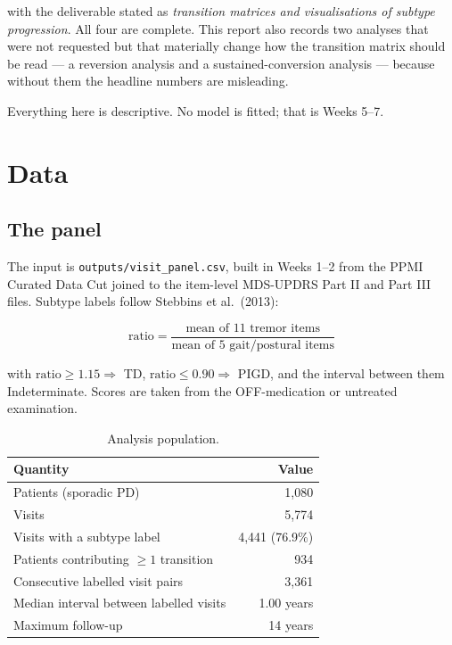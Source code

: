 \documentclass[11pt,a4paper]{article}
\newcommand{\code}[1]{\texttt{\small #1}}
\begin{document}
\noindent
with the deliverable stated as \emph{transition matrices and visualisations of
subtype progression}. All four are complete. This report also records two
analyses that were not requested but that materially change how the transition
matrix should be read --- a reversion analysis and a sustained-conversion
analysis --- because without them the headline numbers are misleading.

Everything here is descriptive. No model is fitted; that is Weeks 5--7.

\section{Data}

\subsection{The panel}

The input is \code{outputs/visit\_panel.csv}, built in Weeks 1--2 from the PPMI
Curated Data Cut joined to the item-level MDS-UPDRS Part II and Part III files.
Subtype labels follow Stebbins et al.\ (2013):

\[
  \text{ratio} = \frac{\text{mean of 11 tremor items}}{\text{mean of 5 gait/postural items}}
\]

with $\text{ratio} \geq 1.15 \Rightarrow$ TD, $\text{ratio} \leq 0.90
\Rightarrow$ PIGD, and the interval between them Indeterminate. Scores are taken
from the OFF-medication or untreated examination.

\begin{table}[htbp]
\centering
\begin{tabular}{@{}lr@{}}
\toprule
\textbf{Quantity} & \textbf{Value} \\
\midrule
Patients (sporadic PD)                       & 1{,}080 \\
Visits                                       & 5{,}774 \\
Visits with a subtype label                  & 4{,}441 \quad (76.9\%) \\
Patients contributing $\geq 1$ transition    & 934 \\
Consecutive labelled visit pairs             & 3{,}361 \\
Median interval between labelled visits      & 1.00 years \\
Maximum follow-up                            & 14 years \\
\bottomrule
\end{tabular}
\caption{Analysis population.}
\end{table}
\end{document}
